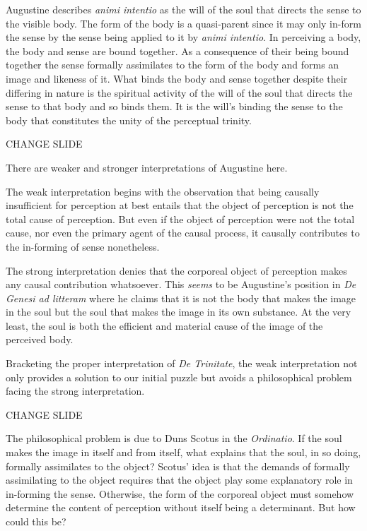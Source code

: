 \documentclass[12pt]{article}
\begin{document}
Augustine describes \emph{animi intentio} as the will of the soul that directs the sense to the visible body. The form of the body is a quasi-parent since it may only in-form the sense by the sense being applied to it by \emph{animi intentio}. In perceiving a body, the body and sense are bound together. As a consequence of their being bound together the sense formally assimilates to the form of the body and forms an image and likeness of it. What binds the body and sense together despite their differing in nature is the spiritual activity of the will of the soul that directs the sense to that body and so binds them. It is the will's binding the sense to the body that constitutes the unity of the perceptual trinity.

CHANGE SLIDE

There are weaker and stronger interpretations of Augustine here. 

The weak interpretation begins with the observation that being causally insufficient for perception at best entails that the object of perception is not the total cause of perception. But even if the object of perception were not the total cause, nor even the primary agent of the causal process, it causally contributes to the in-forming of sense nonetheless.

The strong interpretation denies that the corporeal object of perception makes any causal contribution whatsoever. This \emph{seems} to be Augustine's position in \emph{De Genesi ad litteram} where he claims that it is not the body that makes the image in the soul but the soul that makes the image in its own substance. At the very least, the soul is both the efficient and material cause of the image of the perceived body.

Bracketing the proper interpretation of \emph{De Trinitate}, the weak interpretation not only provides a solution to our initial puzzle but avoids a philosophical problem facing the strong interpretation.

CHANGE SLIDE

The philosophical problem is due to Duns Scotus in the \emph{Ordinatio}. If the soul makes the image in itself and from itself, what explains that the soul, in so doing, formally assimilates to the object? Scotus' idea is that the demands of formally assimilating to the object requires that the object play some explanatory role in in-forming the sense. Otherwise, the form of the corporeal object must somehow determine the content of perception without itself being a determinant. But how could this be?
\end{document}
